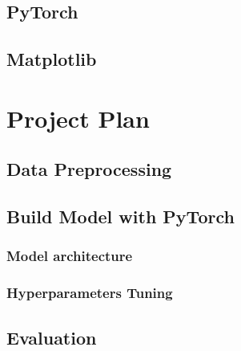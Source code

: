 \documentclass[12pt,twoside]{report}
\begin{document}
\section{PyTorch}

\section{Matplotlib}



\chapter{Project Plan}

\section{Data Preprocessing}

\section{Build Model with PyTorch}
\subsection{Model architecture}
\subsection{Hyperparameters Tuning}

\section{Evaluation}








\end{document}
